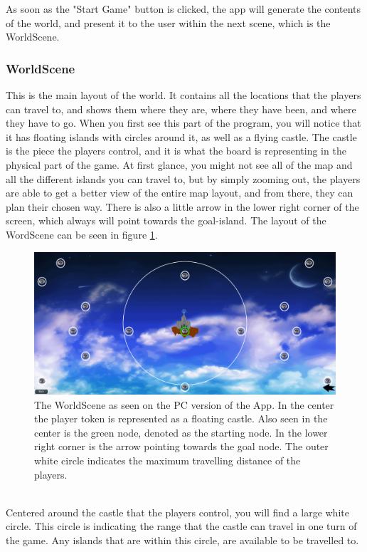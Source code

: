 As soon as the "Start Game" button is clicked, the app will generate the contents of the world, and present it to the user within the next scene, which is the WorldScene.

\subsubsection{WorldScene}
This is the main layout of the world. It contains all the locations that the players can travel to, and shows them where they are, where they have been, and where they have to go.
When you first see this part of the program, you will notice that it has floating islands with circles around it, as well as a flying castle. The castle is the piece the players control, and it is what the board is representing in the physical part of the game.
At first glance, you might not see all of the map and all the different islands you can travel to, but by simply zooming out, the players are able to get a better view of the entire map layout, and from there, they can plan their chosen way. There is also a little arrow in the lower right corner of the screen, which always will point towards the goal-island. 
The layout of the WordScene can be seen in figure \ref{fig:worldSc}.
\begin{figure}[h]
    \centering
    \includegraphics[scale=0.3]{Images/WorldScene.png}
    \caption{The WorldScene as seen on the PC version of the App. In the center the player token is represented as a floating castle. Also seen in the center is the green node, denoted as the starting node. In the lower right corner is the arrow pointing towards the goal node. The outer white circle indicates the maximum travelling distance of the players.}
    \label{fig:worldSc}
\end{figure}\\Centered around the castle that the players control, you will find a large white circle. This circle is indicating the range that the castle can travel in one turn of the game. Any islands that are within this circle, are available to be travelled to.\\
